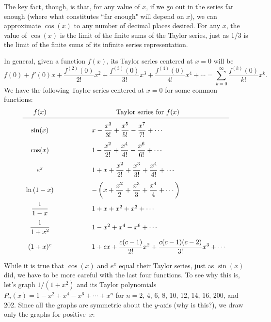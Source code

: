 The key fact, though, is that, for any value of $x$, if we go out in
the series far enough (where what constitutes ``far enough" will
depend on $x$), we can approximate $\cos(x)$ to any number of decimal
places desired. For any $x$, the value of $\cos(x)$ is the limit of
the finite sums of the Taylor series, just as 1/3 is the limit of the
finite sums of its infinite series representation.

In general, given a function $f(x)$, its Taylor series centered at $x=0$ will be
\[
f(0) + f'(0)x + \frac{f^{(2)}(0)}{2!}x^2 + \frac{f^{(3)}(0)}{3!}x^3 
   + \frac{f^{(4)}(0)}{4!}x^4 + \cdots 
   = \sum_{k=0}^{\infty} \frac{f^{(k)}(0)}{k!}x^k.
\]
We have the following Taylor series centered at
$x=0$ for some common functions:
\[
\begin{array}{ccl}
        f(x) &\hspace{.5in} & \hspace{.5in}\mbox{Taylor series for $f(x)$} \\ [2pt] \hline
        & & \\ [-6pt] 
        \sin(x) & &  x - \dfrac{x^3}{3!} + \dfrac{x^5}{5!} 
                - \dfrac{x^7}{7!} + \cdots \\[.15in]
        \cos(x) & & 1 - \dfrac{x^2}{2!} + \dfrac{x^4}{4!} 
                - \dfrac{x^6}{6!} + \cdots \\[.15in]
        e^x & & 1 + x + \dfrac{x^2}{2!} + \dfrac{x^3}{3!} 
                + \dfrac{x^4}{4!} + \cdots  \\[.15in]
        \ln{(1-x)}& & -\left(x + \dfrac{x^2}{2} + \dfrac{x^3}{3} 
                + \dfrac{x^4}{4} + \cdots \right)\\[.15in]
        \dfrac{1}{1-x} & &  1 + x + x^2 + x^3 + \cdots \\ [.15in]
        \dfrac{1}{1+x^2}& & 1 - x^2 + x^4 - x^6 + \cdots \\ [.15in]
        (1+x)^c & & 1 +cx+ \dfrac{c(c-1)}{2!}x^2 
           + \dfrac{c(c-1)(c-2)}{3!}x^3 + \cdots
        \end{array}
\]

While it is true that $\cos(x)$ and $e^x$ equal their Taylor series,
just as $\sin(x)$ did, we have to be more careful with the last four
functions.  To see why this is, let's graph $1/(1+x^2)$ and its Taylor
polynomials $P_n(x) = 1-x^2+ x^4-x^6+\cdots \pm x^n$ for $n=2$, 4, 6,
8, 10, 12, 14, 16, 200, and 202.  Since all the graphs are symmetric
about the $y$-axis (why is this?), we draw only the graphs for
positive~$x$:

